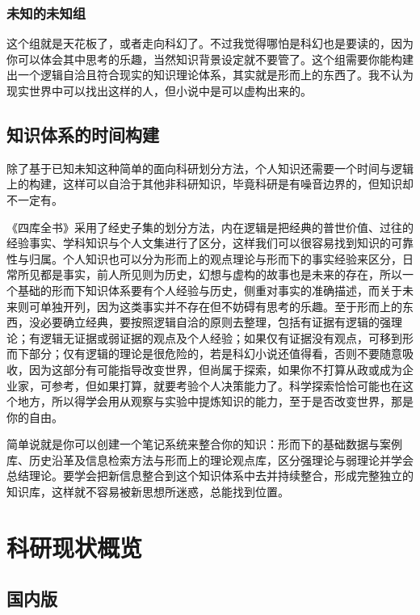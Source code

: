 \documentclass[]{book}
\begin{document}
\subsection{未知的未知组}

这个组就是天花板了，或者走向科幻了。不过我觉得哪怕是科幻也是要读的，因为你可以体会其中思考的乐趣，当然知识背景设定就不要管了。这个组需要你能构建出一个逻辑自洽且符合现实的知识理论体系，其实就是形而上的东西了。我不认为现实世界中可以找出这样的人，但小说中是可以虚构出来的。

\section{知识体系的时间构建}

除了基于已知未知这种简单的面向科研划分方法，个人知识还需要一个时间与逻辑上的构建，这样可以自洽于其他非科研知识，毕竟科研是有噪音边界的，但知识却不一定有。

《四库全书》采用了经史子集的划分方法，内在逻辑是把经典的普世价值、过往的经验事实、学科知识与个人文集进行了区分，这样我们可以很容易找到知识的可靠性与归属。个人知识也可以分为形而上的观点理论与形而下的事实经验来区分，日常所见都是事实，前人所见则为历史，幻想与虚构的故事也是未来的存在，所以一个基础的形而下知识体系要有个人经验与历史，侧重对事实的准确描述，而关于未来则可单独开列，因为这类事实并不存在但不妨碍有思考的乐趣。至于形而上的东西，没必要确立经典，要按照逻辑自洽的原则去整理，包括有证据有逻辑的强理论；有逻辑无证据或弱证据的观点及个人经验；如果仅有证据没有观点，可移到形而下部分；仅有逻辑的理论是很危险的，若是科幻小说还值得看，否则不要随意吸收，因为这部分有可能指导改变世界，但尚属于探索，如果你不打算从政或成为企业家，可参考，但如果打算，就要考验个人决策能力了。科学探索恰恰可能也在这个地方，所以得学会用从观察与实验中提炼知识的能力，至于是否改变世界，那是你的自由。

简单说就是你可以创建一个笔记系统来整合你的知识：形而下的基础数据与案例库、历史沿革及信息检索方法与形而上的理论观点库，区分强理论与弱理论并学会总结理论。要学会把新信息整合到这个知识体系中去并持续整合，形成完整独立的知识库，这样就不容易被新思想所迷惑，总能找到位置。

\chapter{科研现状概览}\label{view}

\section{国内版}
\end{document}
